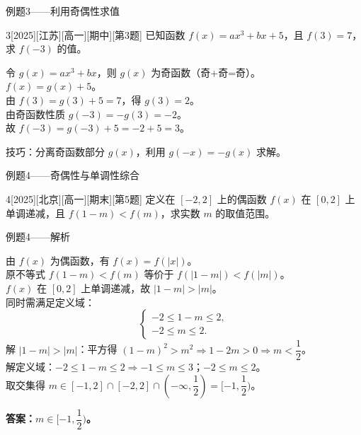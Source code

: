 \documentclass[aspectratio=169,11pt]{ctexbeamer}
\newenvironment{tip}[1][提示]{\begin{tipbox}[#1]}{\end{tipbox}}
\renewenvironment{tip}[1][提示]{\begin{tipbox}[#1]}{\end{tipbox}}
\newenvironment{solutions}{%
	\par\medskip
	\noindent{\color{ProofRed}\bfseries【解析】：}
	\par\vspace{0.3em}
}{%
	\par\medskip
}
\renewcommand{\frac}{\dfrac}
\begin{document}
	\begin{frame}{例题3——利用奇偶性求值}
		\begin{example}{3}[2025][江苏][高一][期中][第3题]
			已知函数 $f(x)=ax^3+bx+5$，且 $f(3)=7$，求 $f(-3)$ 的值。
		\end{example}
		\pause
		\begin{solutions}
			令 $g(x)=ax^3+bx$，则 $g(x)$ 为奇函数（奇+奇=奇）。\\
			$f(x)=g(x)+5$。\\
			由 $f(3)=g(3)+5=7$，得 $g(3)=2$。\\
			由奇函数性质 $g(-3)=-g(3)=-2$。\\
			故 $f(-3)=g(-3)+5=-2+5=3$。
		\end{solutions}
		\pause
		\begin{tip}
			技巧：分离奇函数部分 $g(x)$，利用 $g(-x)=-g(x)$ 求解。
		\end{tip}
	\end{frame}
	
	\begin{frame}{例题4——奇偶性与单调性综合}
		\begin{example}{4}[2025][北京][高一][期末][第5题]
			定义在 $[-2,2]$ 上的偶函数 $f(x)$ 在 $[0,2]$ 上单调递减，且 $f(1-m)<f(m)$，求实数 $m$ 的取值范围。
		\end{example}
	\end{frame}
	
	\begin{frame}[allowframebreaks]{例题4——解析}
		\begin{solutions}
			由 $f(x)$ 为偶函数，有 $f(x)=f(|x|)$。\\
			原不等式 $f(1-m)<f(m)$ 等价于 $f(|1-m|)<f(|m|)$。\\[3mm]
			$f(x)$ 在 $[0,2]$ 上单调递减，故 $|1-m|>|m|$。\\[3mm]
			同时需满足定义域：
			\[
			\begin{cases}
				-2\le 1-m\le 2,\\
				-2\le m\le 2.
			\end{cases}
			\]
			解 $|1-m|>|m|$：平方得 $(1-m)^2>m^2\Rightarrow 1-2m>0\Rightarrow m<\dfrac12$。\\
			解定义域：$-2\le 1-m\le 2\Rightarrow -1\le m\le 3$；$-2\le m\le 2$。\\
			取交集得 $m\in[-1,2]\cap[-2,2]\cap\left(-\infty,\frac12\right)=[-1,\frac12)$。
		\end{solutions}
		\vspace{2mm}
		\color{ProofRed}\textbf{答案：$m\in[-1,\frac12)$。}
	\end{frame}
	
\end{document}
